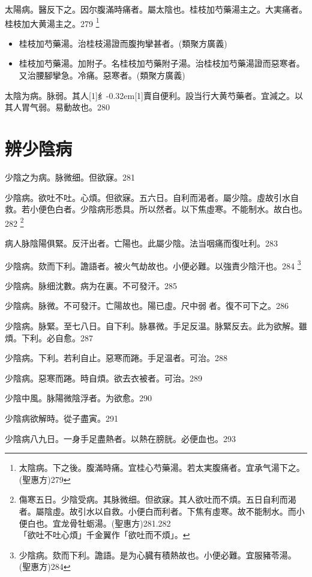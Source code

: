 \documentclass[oneside,b4paper]{ctexbook}
\begin{document}
\begin{flushleft}
[本]太陽病。醫反下之。因尔腹滿時痛者。屬太陰也。桂枝加芍藥湯主之。大実痛者。桂枝加大黄湯主之。279
\footnote{太陰病。下之後。腹滿時痛。宜桂心芍藥湯。若太実腹痛者。宜承气湯下之。(聖惠方)279}

\begin{itemize}
\item 桂枝加芍藥湯。治桂枝湯證而腹拘攣甚者。(類聚方廣義)
\item 桂枝加芍藥湯。加附子。名桂枝加芍藥附子湯。治桂枝加芍藥湯證而惡寒者。又治腰腳攣急。冷痛。惡寒者。(類聚方廣義)
\end{itemize}

太陰为病。脉弱。其人{\hbox{\scalebox{0.6}[1]{纟}\kern-0.32em\scalebox{0.7}[1]{賣}}}自便利。設当行大黄芍藥者。宜減之。以其人胃气弱。易動故也。280

\chapter{辨少陰病}

少陰之为病。脉微细。但欲寐。281

少陰病。欲吐不吐。心煩。但欲寐。五六日。自利而渴者。屬少陰。虛故引水自救。若小便色白者。少陰病形悉具。所以然者。以下焦虛寒。不能制水。故白也。282
\footnote{傷寒五日。少陰受病。其脉微细。但欲寐。其人欲吐而不煩。五日自利而渴者。屬陰虛。故引水以自救。小便白而利者。下焦有虛寒。故不能制水。而小便白也。宜龙骨牡蛎湯。(聖惠方)281.282\\「欲吐不吐心煩」千金翼作「欲吐而不煩」。}

病人脉陰陽俱緊。反汗出者。亡陽也。此屬少陰。法当咽痛而復吐利。283

少陰病。欬而下利。譫語者。被火气劫故也。小便必難。以強責少陰汗也。284
\footnote{少陰病。欬而下利。譫語。是为心臓有積熱故也。小便必難。宜服豬苓湯。(聖惠方)284}

少陰病。脉细沈數。病为在裏。不可發汗。285

少陰病。脉微。不可發汗。亡陽故也。陽已虛。尺中弱{𬈧}者。復不可下之。286

少陰病。脉緊。至七八日。自下利。脉暴微。手足反温。脉緊反去。此为欲解。雖煩。下利。必自愈。287

少陰病。下利。若利自止。惡寒而踡。手足温者。可治。288

少陰病。惡寒而踡。時自煩。欲去衣被者。可治。289

少陰中風。脉陽微陰浮者。为欲愈。290

少陰病欲解時。從子盡寅。291

少陰病八九日。一身手足盡熱者。以熱在膀胱。必便血也。293


\end{flushleft}
\end{document}
